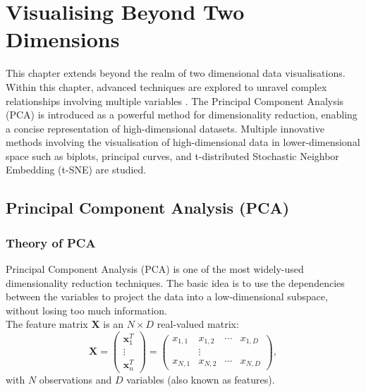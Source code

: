 \documentclass{article}\usepackage[]{graphicx}\usepackage[]{xcolor}
\numberwithin{equation}{section}
\begin{document}
{\newpage

\section{Visualising Beyond Two Dimensions} 

\noindent This chapter extends beyond the realm of two dimensional data visualisations. Within this chapter, advanced techniques are explored to unravel complex relationships involving multiple variables \cite{ward2010interactive}. The Principal Component Analysis (PCA) is introduced as a powerful method for dimensionality reduction, enabling a concise representation of high-dimensional datasets. Multiple innovative methods involving the visualisation of high-dimensional data in lower-dimensional space such as biplots, principal curves, and t-distributed Stochastic Neighbor Embedding (t-SNE) are studied. 

\subsection{Principal Component Analysis (PCA)}

\subsubsection{Theory of PCA}
\noindent
Principal Component Analysis (PCA) is one of the most widely-used dimensionality reduction techniques. The basic idea is to use the dependencies between the variables to project the data into a low-dimensional subspace, without losing too much information.\\

\noindent
The feature matrix $\mathbf{X}$ is an $N \times D$ real-valued matrix:
$$\mathbf{X} = \left( \begin{array}{ccc}
    \mathbf{x}^{T}_{1}\\
    \vdots\\
    \mathbf{x}^{T}_{n}
    \end{array} \right) = \begin{pmatrix}
x_{1,1} & x_{1,2} & \cdots & x_{1,D} \\
 &\vdots & & \\
x_{N,1} & x_{N,2} & \cdots & x_{N,D}
\end{pmatrix},$$
\noindent
with $N$ observations and $D$ variables (also known as features).\\

}
\end{document}
